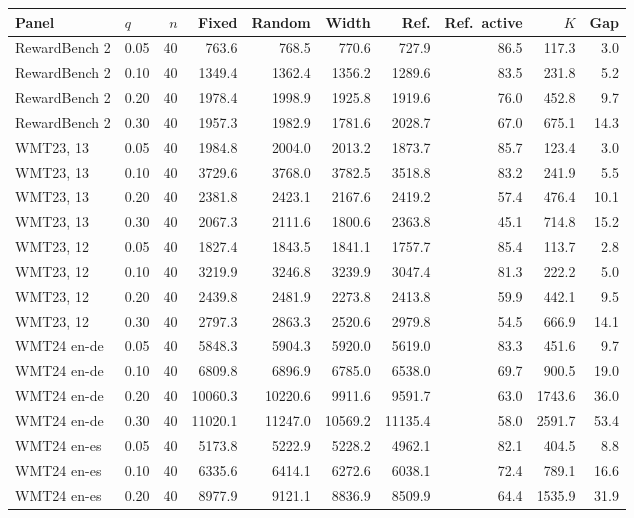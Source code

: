 \begin{table}[t]
\centering\small


\begin{tabular}{llrrrrrrrr}
\toprule
Panel & $q$ & $n$ & Fixed & Random & Width & Ref. & Ref.\ active & $K$ & Gap \\
\midrule
RewardBench 2 & 0.05 & 40 & 763.6 & 768.5 & 770.6 & 727.9 & 86.5 & 117.3 & 3.0 \\
RewardBench 2 & 0.10 & 40 & 1349.4 & 1362.4 & 1356.2 & 1289.6 & 83.5 & 231.8 & 5.2 \\
RewardBench 2 & 0.20 & 40 & 1978.4 & 1998.9 & 1925.8 & 1919.6 & 76.0 & 452.8 & 9.7 \\
RewardBench 2 & 0.30 & 40 & 1957.3 & 1982.9 & 1781.6 & 2028.7 & 67.0 & 675.1 & 14.3 \\
WMT23, 13 & 0.05 & 40 & 1984.8 & 2004.0 & 2013.2 & 1873.7 & 85.7 & 123.4 & 3.0 \\
WMT23, 13 & 0.10 & 40 & 3729.6 & 3768.0 & 3782.5 & 3518.8 & 83.2 & 241.9 & 5.5 \\
WMT23, 13 & 0.20 & 40 & 2381.8 & 2423.1 & 2167.6 & 2419.2 & 57.4 & 476.4 & 10.1 \\
WMT23, 13 & 0.30 & 40 & 2067.3 & 2111.6 & 1800.6 & 2363.8 & 45.1 & 714.8 & 15.2 \\
WMT23, 12 & 0.05 & 40 & 1827.4 & 1843.5 & 1841.1 & 1757.7 & 85.4 & 113.7 & 2.8 \\
WMT23, 12 & 0.10 & 40 & 3219.9 & 3246.8 & 3239.9 & 3047.4 & 81.3 & 222.2 & 5.0 \\
WMT23, 12 & 0.20 & 40 & 2439.8 & 2481.9 & 2273.8 & 2413.8 & 59.9 & 442.1 & 9.5 \\
WMT23, 12 & 0.30 & 40 & 2797.3 & 2863.3 & 2520.6 & 2979.8 & 54.5 & 666.9 & 14.1 \\
WMT24 en-de & 0.05 & 40 & 5848.3 & 5904.3 & 5920.0 & 5619.0 & 83.3 & 451.6 & 9.7 \\
WMT24 en-de & 0.10 & 40 & 6809.8 & 6896.9 & 6785.0 & 6538.0 & 69.7 & 900.5 & 19.0 \\
WMT24 en-de & 0.20 & 40 & 10060.3 & 10220.6 & 9911.6 & 9591.7 & 63.0 & 1743.6 & 36.0 \\
WMT24 en-de & 0.30 & 40 & 11020.1 & 11247.0 & 10569.2 & 11135.4 & 58.0 & 2591.7 & 53.4 \\
WMT24 en-es & 0.05 & 40 & 5173.8 & 5222.9 & 5228.2 & 4962.1 & 82.1 & 404.5 & 8.8 \\
WMT24 en-es & 0.10 & 40 & 6335.6 & 6414.1 & 6272.6 & 6038.1 & 72.4 & 789.1 & 16.6 \\
WMT24 en-es & 0.20 & 40 & 8977.9 & 9121.1 & 8836.9 & 8509.9 & 64.4 & 1535.9 & 31.9 \\

\end{tabular}
\end{table}
